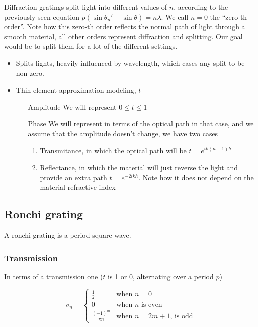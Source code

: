 \documentclass[../main/main.tex]{subfiles}
\begin{document}
Diffraction gratings split light into different values of $n$, according to the previously seen equation $p (\sin \theta_{n}' - \sin \theta) = n \lambda$. We call $n=0$ the ``zero-th order''. Note how this zero-th order reflects the normal path of light through a smooth material, all other orders represent diffraction and splitting. Our goal would be to split them for a lot of the different settings.
\begin{itemize}
	\item Splits lights, heavily influenced  by wavelength, which cases any split to be non-zero.
	\item Thin element approximation modeling, $t$
	\begin{enumerate}
		\item[Amplitude] We will represent $0 \leq t \leq 1$
		\item[Phase] We will represent in terms of the optical path in that case, and we assume that the amplitude doesn't change, we have two cases
		\begin{enumerate}
			\item Transmitance, in which the optical path will be $t = e^{i k (n-1) h }$
			\item Reflectance, in which the material will just reverse the light and provide an extra path $t = e^{-2i k  h }$. Note how it does not depend on the material refractive index

		\end{enumerate}
	\end{enumerate}
\end{itemize}

\subsection{Ronchi grating}

A ronchi grating is a  period square wave.

\subsubsection{Transmission}
In terms of a transmission one ($t$ is 1 or 0, alternating over a period $p$)

\begin{equation}
a_{n} = \begin{cases}
\frac 1 2 & \textrm{when $n = 0$}\\
0 & \textrm{when $n$ is even}\\
\frac {(-1)^{m}}{\pi n} & \textrm{when $n = 2m + 1$, is odd}
\end{cases}
\end{equation}
\end{document}
